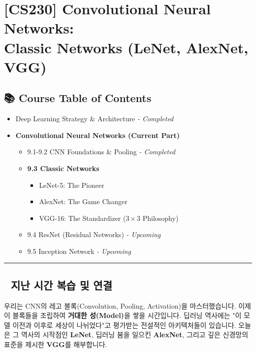 \documentclass[11pt,a4paper]{book}
\theoremstyle{definition}
\begin{document}
\chapter{[CS230] Convolutional Neural Networks: \\ Classic Networks (LeNet, AlexNet, VGG)}
\label{ch:lecture31}

\section*{📚 Course Table of Contents}
\begin{itemize}
    \item[Chapter 1-8.] Deep Learning Strategy \& Architecture \textit{- Completed}
    \item[\textbf{Chapter 9.}] \textbf{Convolutional Neural Networks (Current Part)}
    \begin{itemize}
        \item 9.1-9.2 CNN Foundations \& Pooling \textit{- Completed}
        \item \textbf{9.3 Classic Networks}
        \begin{itemize}
            \item LeNet-5: The Pioneer
            \item AlexNet: The Game Changer
            \item VGG-16: The Standardizer ($3 \times 3$ Philosophy)
        \end{itemize}
        \item 9.4 ResNet (Residual Networks) \textit{- Upcoming}
        \item 9.5 Inception Network \textit{- Upcoming}
    \end{itemize}
\end{itemize}

\vspace{0.5cm}
\hrule
\vspace{0.5cm}

\section*{🔗 지난 시간 복습 및 연결}
우리는 CNN의 레고 블록(Convolution, Pooling, Activation)을 마스터했습니다. 이제 이 블록들을 조립하여 \textbf{거대한 성(Model)}을 쌓을 시간입니다.
딥러닝 역사에는 "이 모델 이전과 이후로 세상이 나뉘었다"고 평가받는 전설적인 아키텍처들이 있습니다. 오늘은 그 역사의 시작점인 \textbf{LeNet}, 딥러닝 붐을 일으킨 \textbf{AlexNet}, 그리고 깊은 신경망의 표준을 제시한 \textbf{VGG}를 해부합니다.
\end{document}

